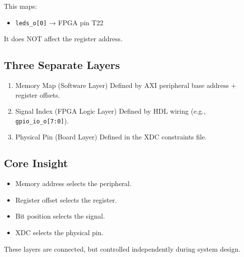 This maps:

\begin{itemize}
    \item \texttt{leds\_o[0]} → FPGA pin T22
\end{itemize}

It does NOT affect the register address.

\subsection{Three Separate Layers}

\begin{enumerate}
    \item Memory Map (Software Layer)  
    Defined by AXI peripheral base address + register offsets.

    \item Signal Index (FPGA Logic Layer)  
    Defined by HDL wiring (e.g., \texttt{gpio\_io\_o[7:0]}).

    \item Physical Pin (Board Layer)  
    Defined in the XDC constraints file.
\end{enumerate}

\subsection{Core Insight}

\begin{itemize}
    \item Memory address selects the peripheral.
    \item Register offset selects the register.
    \item Bit position selects the signal.
    \item XDC selects the physical pin.
\end{itemize}

These layers are connected, but controlled independently during system design.